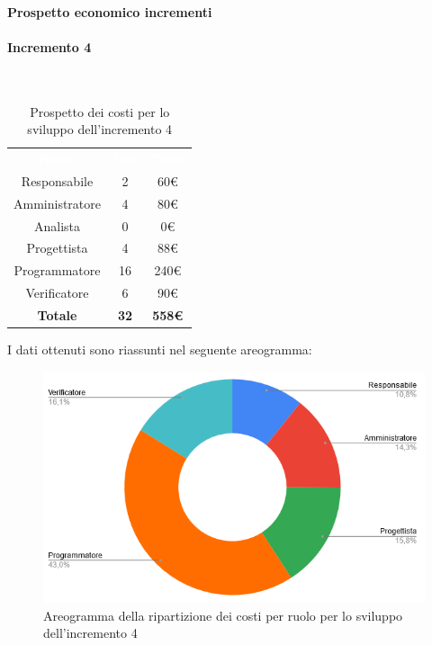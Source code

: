 \paragraph{Prospetto economico incrementi}
\paragraph*{Incremento 4}\mbox{} \\
\begin{table}[H]
\centering\renewcommand{\arraystretch}{1.5}
\caption{Prospetto dei costi per lo sviluppo dell'incremento 4}
\vspace{0.2cm}
\begin{tabular}{ c c c }
\rowcolor{redafk}
\textcolor{white}{\textbf{Ruolo}} & \textcolor{white}{\textbf{Ore}} &
\textcolor{white}{\textbf{Costo}}  \\
Responsabile & 2 & 60€ \\
Amministratore & 4 & 80€ \\
Analista & 0 & 0€ \\
Progettista & 4 & 88€ \\
Programmatore & 16 & 240€  \\
Verificatore & 6 & 90€  \\
\rowcolor{lastrowcolor}
\textbf{Totale} & \textbf{32} & \textbf{558€}  \\
\end{tabular}
\end{table}
 
I dati ottenuti sono riassunti nel seguente areogramma:
\begin{figure}[H]
\centering
\includegraphics[scale=0.60]{img/grafici/torta_inc4.png}
\caption{Areogramma della ripartizione dei costi per ruolo per lo sviluppo dell'incremento 4}
\end{figure}

